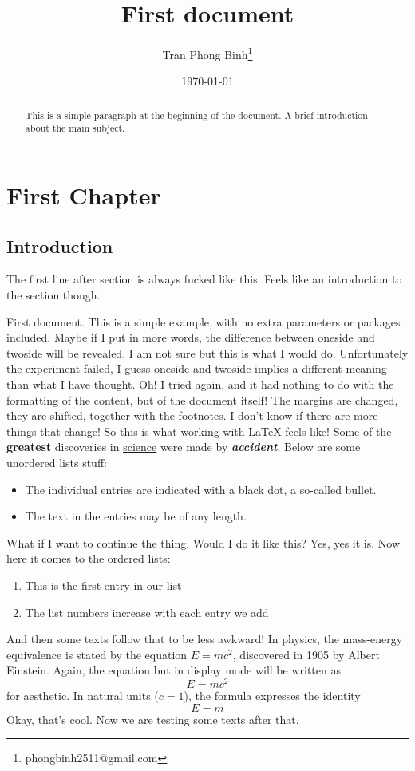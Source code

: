 \documentclass[12pt, letterpaper, oneside]{report}
\title{First document}
\author{Tran Phong Binh\thanks{phongbinh2511@gmail.com}}
\date{\today}
\begin{document}
\maketitle

\begin{abstract}
This is a simple paragraph at the beginning of the document. A brief introduction about the main subject.
\end{abstract}

\tableofcontents

\chapter{First Chapter}

\section{Introduction}
The first line after section is always fucked like this. Feels like an introduction to the section though.

First document. This is a simple example, with no extra parameters or packages included. Maybe if I put in more words, the difference between oneside and twoside will be revealed. I am not sure but this is what I would do. Unfortunately the experiment failed, I guess oneside and twoside implies a different meaning than what I have thought. Oh! I tried again, and it had nothing to do with the formatting of the content, but of the document itself! The margins are changed, they are shifted, together with the footnotes. I don't know if there are more things that change! So this is what working with \LaTeX{} feels like! Some of the \textbf{greatest} discoveries in \underline{science} were made by \textbf{\textit{accident}}. Below are some unordered lists stuff:
\begin{itemize}
    \item The individual entries are indicated with a black dot, a so-called bullet.
    \item The text in the entries may be of any length.
\end{itemize}
What if I want to continue the thing. Would I do it like this? Yes, yes it is. Now here it comes to the ordered lists:
\begin{enumerate}
    \item This is the first entry in our list
    \item The list numbers increase with each entry we add
\end{enumerate}
And then some texts follow that to be less awkward! In physics, the mass-energy equivalence is stated by the equation $E = mc^2$, discovered in 1905 by Albert Einstein. Again, the equation but in display mode will be written as
\[ E = mc^2 \]
for aesthetic. In natural units ($c = 1$), the formula expresses the identity
\begin{equation}
E = m
\end{equation}
Okay, that's cool. Now we are testing some texts after that.
\end{document}
